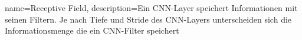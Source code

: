   
{
	name={Receptive Field},
	description={Ein CNN-Layer speichert Informationen mit seinen Filtern. Je nach Tiefe und Stride des CNN-Layers unterscheiden sich die Informationsmenge die ein CNN-Filter speichert}
}
